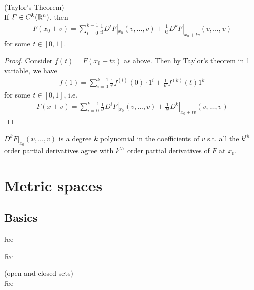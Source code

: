 \documentclass[a4paper]{article}
\begin{document}
\begin{thm} (Taylor's Theorem)\\
If $F \in C^k (\mathbb{R}^n)$, then
\begin{equation*}
\begin{aligned}
F(x_0+v)=\sum_{i=0}^{k-1} \frac{1}{i!} D^i F|_{x_0}(v,...,v)+\frac{1}{k!}D^k F|_{x_0+tv}(v,...,v)
\end{aligned}
\end{equation*}
for some $t \in [0,1]$.
\begin{proof}
Consider $f(t)=F(x_0+tv)$ as above. Then by Taylor's theorem in 1 variable, we have
\begin{equation*}
\begin{aligned}
f(1)= \sum_{i=0}^{k-1}\frac{1}{i!}f^{(i)} (0) \cdot 1^i + \frac{1}{k!} f^{(k)} (t) 1^k
\end{aligned}
\end{equation*}
for some $t \in [0,1]$, i.e.
\begin{equation*}
\begin{aligned}
F(x+v)=\sum_{i=0}^{k-1}\frac{1}{i!}D^i F|_{x_0} (v,...,v)+\frac{1}{k!} D^k|_{x_0+tv}(v,...,v)
\end{aligned}
\end{equation*}
\end{proof}
\end{thm}

\begin{rem}
$D^k F|_{x_0}(v,...,v)$ is a degree $k$ polynomial in the coefficients of $v$ s.t. all the $k^{th}$ order partial derivatives agree with $k^{th}$ order partial derivatives of $F$ at $x_0$.
\end{rem}

\newpage

\section{Metric spaces}
\subsection{Basics}
\begin{defi}
l$\ddot{u}$e
\end{defi}

\begin{eg}
l$\ddot{u}$e
\end{eg}

\begin{defi}(open and closed sets)\\
l$\ddot{u}$e
\end{defi}
\end{document}
